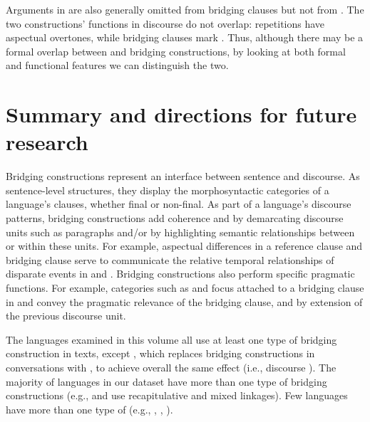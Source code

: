\documentclass[output=paper]{LSP/langsci}
\begin{document}
Arguments in  are also generally omitted from bridging clauses but not from . The two constructions’ functions in discourse do not overlap: repetitions have aspectual overtones, while bridging clauses mark  \citep[][513--522]{kasia17}. Thus, although there may be a formal overlap between  and bridging constructions, by looking at both formal and functional features we can distinguish the two.

\section{Summary and directions for future research}
\label{GuAi6summary}\label{sec:guerin:6}
Bridging constructions represent an interface between sentence and discourse. As sentence-level structures, they display the morphosyntactic categories of a language's clauses, whether final or non-final. As part of a language’s discourse patterns, bridging constructions add coherence and  by demarcating discourse units such as paragraphs and/or by highlighting semantic relationships between or within these units. For example, aspectual differences in a reference clause and bridging clause serve to communicate the relative temporal relationships of disparate events in   and  . Bridging constructions also perform specific pragmatic functions. For example, categories such as  and focus attached to a bridging clause in   and   convey the pragmatic relevance of the bridging clause, and by extension of the previous discourse unit. 

The languages examined in this volume all use at least one type of bridging construction in texts, except , which replaces bridging constructions in conversations with , to achieve overall the same effect (i.e., discourse ). The majority of languages in our dataset have more than one type of bridging constructions (e.g.,  and  use recapitulative and mixed linkages). Few languages have more than one type of  (e.g., , , ).
\end{document}
